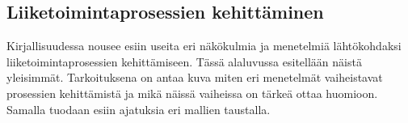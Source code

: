 \documentclass[finnish,12pt,a4paper,pdftex]{article}
\begin{document}

\subsection{Liiketoimintaprosessien kehittäminen}

\noindent Kirjallisuudessa nousee esiin useita eri näkökulmia ja menetelmiä lähtökohdaksi  liiketoimintaprosessien kehittämiseen. Tässä alaluvussa esitellään näistä yleisimmät. Tarkoituksena on antaa kuva miten eri menetelmät vaiheistavat prosessien kehittämistä ja mikä näissä vaiheissa on tärkeä ottaa huomioon. Samalla tuodaan esiin ajatuksia eri mallien taustalla.






\end{document}

